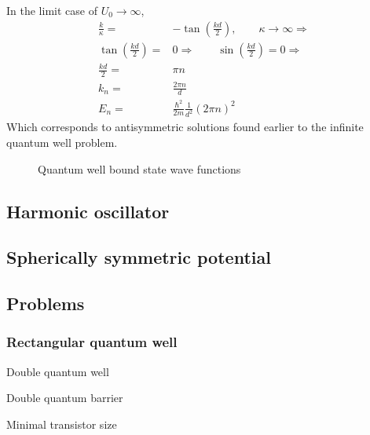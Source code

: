 		In the limit case of $U_0 \rightarrow \infty$,
		\begin{align}
			\frac{k}{\kappa} =& -\tan(\frac{kd}{2}),\qquad \kappa \rightarrow \infty \Rightarrow \\
			\tan(\frac{kd}{2}) =& 0 \Rightarrow\qquad	\sin(\frac{kd}{2}) = 0 \Rightarrow\\
			\frac{kd}{2} =& \pi n \\
			k_n =& \frac{2\pi n}{d} \\
			E_n =& \frac{\hbar^2}{2m}\frac{1}{d^2}\left(2\pi n\right)^2
		\end{align}
		Which corresponds to antisymmetric solutions found earlier to the infinite quantum well problem.		
		
		\begin{figure}[!h]
			\centering
			
			\caption{Quantum well bound state wave functions}
		\end{figure}		
	\subsection{Harmonic oscillator}
	\subsection{Spherically symmetric potential}
	\subsection{Problems}
		\subsubsection{Rectangular quantum well}
			Double quantum well
			
			Double quantum barrier
			
			Minimal transistor size
			
			